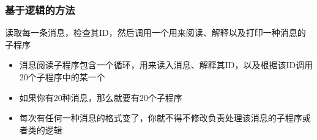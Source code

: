 \begin{figure}[H]
    \setcounter{subfigure}{0}
	\centering
	\vspace{-0.5em}	
	\centering
	\vspace{-1em}
\end{figure}

\subsubsection{基于逻辑的方法}
读取每一条消息，检查其ID，然后调用一个用来阅读、解释以及打印一种消息的子程序
\begin{itemize}
    \item 消息阅读子程序包含一个循环，用来读入消息、解释其ID，以及根据该ID调用20个子程序中的某一个
    \item 如果你有20种消息，那么就要有20个子程序
    \item 每次有任何一种消息的格式变了，你就不得不修改负责处理该消息的子程序或者类的逻辑
\end{itemize}

